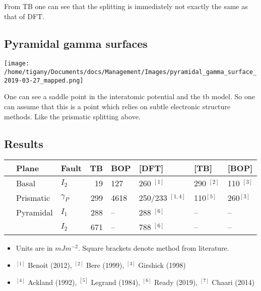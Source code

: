 \documentclass[11pt]{article}
\begin{document}
\begin{NOTES}


From TB one can see that the splitting is immediately not exactly the same as
that of DFT. 
\end{NOTES}

\subsection*{Pyramidal gamma surfaces}
\label{sec:orge09ef90}
\begin{center}
\texttt{[image: /home/tigany/Documents/docs/Management/Images/pyramidal\_gamma\_surface\_2019-03-27\_mapped.png]}
\label{org2f7bef7}
\end{center}

\begin{notes}


One can see a saddle point in the interatomic potential and the tb model. So
one can assume that this is a point which relies on subtle electronic
structure methods. Like the prismatic splitting above. 
\end{notes}

\subsection*{Results}
\label{sec:org0aa53a4}
\begin{center}
\begin{tabular}{lllrllll}
 & Plane & Fault & TB & BOP & [DFT] & [TB] & [BOP]\\
\hline
 & Basal & \(I_{2}\) & 19 & 127 & 260 \(^{[1]}\) & 290 \(^{[2]}\) & 110 \(^{[3]}\)\\
\hline
 & Prismatic & \(\gamma_{P}\) & 299 & 4618 & 250/233 \(^{[1,4]}\) & 110\(^{[5]}\) & 260\(^{[3]}\)\\
\hline
 & Pyramidal & \(I_{1}\) & 288 & -- & 288 \(^{[6]}\) & -- & --\\
 &  & \(I_{2}\) & 671 & -- & 788 \(^{[6]}\) & -- & --\\
\end{tabular}
\end{center}


\begin{itemize}
\item Units are in \(mJm^{-2}\). Square brackets denote method from literature.
\item \(^{[1]}\) Benoit (2012), \(^{[2]}\) Bere (1999), \(^{[3]}\) Girshick (1998)
\item \(^{[4]}\) Ackland (1992), \(^{[5]}\) Legrand (1984), \(^{[6]}\) Ready (2019), \(^{[7]}\) Chaari (2014)
\end{itemize}
\end{document}
